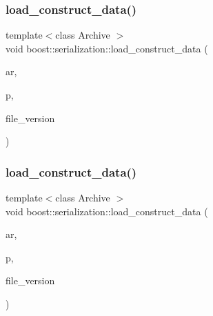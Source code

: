 \mbox{\label{namespaceboost_1_1serialization_a9d377eba228f523e12084976fe9a094a}} 
\subsubsection{\texorpdfstring{load\+\_\+construct\+\_\+data()}{load\_construct\_data()}\hspace{0.1cm}{\footnotesize\ttfamily [3/4]}}
{\footnotesize\ttfamily template$<$class Archive $>$ \\
void boost\+::serialization\+::load\+\_\+construct\+\_\+data (\begin{DoxyParamCaption}\item[{Archive \&}]{ar,  }\item[{\hyperlink{classpan_1_1_card_impl}{pan\+::\+Card\+Impl}$<$ \hyperlink{namespacepan_a1f7350bfd0421afeabe9fa95c16fa811aa4ecfc70574394990cf17bd83df499f7}{pan\+::\+Card\+Type\+::\+Event} $>$ $\ast$}]{p,  }\item[{const unsigned int}]{file\+\_\+version }\end{DoxyParamCaption})\hspace{0.3cm}{\ttfamily [inline]}}

\mbox{\label{namespaceboost_1_1serialization_a3847d195920e64d3cc539225f4fe261b}} 
\subsubsection{\texorpdfstring{load\+\_\+construct\+\_\+data()}{load\_construct\_data()}\hspace{0.1cm}{\footnotesize\ttfamily [4/4]}}
{\footnotesize\ttfamily template$<$class Archive $>$ \\
void boost\+::serialization\+::load\+\_\+construct\+\_\+data (\begin{DoxyParamCaption}\item[{Archive \&}]{ar,  }\item[{\hyperlink{classpan_1_1_player_base}{pan\+::\+Player\+Base} $\ast$}]{p,  }\item[{const unsigned int}]{file\+\_\+version }\end{DoxyParamCaption})\hspace{0.3cm}{\ttfamily [inline]}}


